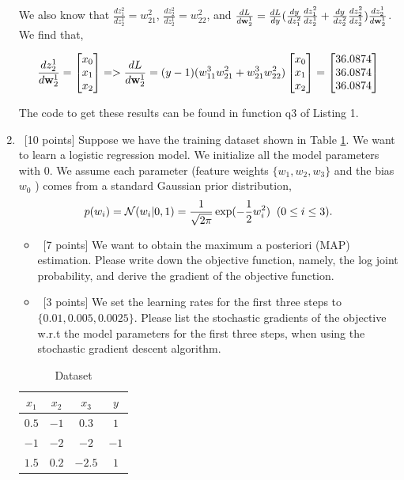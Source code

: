 \documentclass[12pt, fullpage,letterpaper]{article}
\begin{document}
\begin{enumerate}
	We also know that $\frac{dz^2_1}{dz^1_2} = w^2_{21}$, $\frac{dz^2_2}{dz^1_2} = w^2_{22}$, and $\frac{dL}{d{\bf w}^1_2} = \frac{dL}{dy} (\frac{dy}{dz^2_1} \frac{dz^2_1}{dz^1_2} + \frac{dy}{dz^2_2} \frac{dz^2_2}{dz^1_2}) \frac{dz^1_2} {d{\bf w}^1_2}$. We find that,
	
	\[
	    \frac{dz^1_2}{d{\bf w}^1_2} = \begin{bmatrix}
	        x_0 \\
	        x_1 \\
	        x_2
	    \end{bmatrix} => \frac{dL}{d{\bf w}^1_2} = (y - 1) (w^3_{11} w^2_{21} + w^3_{21} w^2_{22}) \begin{bmatrix}
	        x_0 \\
	        x_1 \\
	        x_2
	    \end{bmatrix} = \begin{bmatrix}
	        36.0874 \\
	        36.0874 \\
	        36.0874
	    \end{bmatrix}
	\]
	
	The code to get these results can be found in function q3 of Listing 1.
	
	\item~[10 points] Suppose we have the training dataset shown in Table \ref{tb:dt}. We want to learn a logistic regression model. We initialize all the model parameters with $0$.  We assume each parameter (\ie feature weights $\{w_1, w_2, w_3\}$ and the bias $w_0$ ) comes from a standard Gaussian prior distribution, 
	\[
	p(w_i) = \mathcal{N}(w_i|0,1) = \frac{1}{\sqrt{2\pi}}\exp(-\frac{1}{2}w_i^2)\;\;(0\le i\le 3).
	\]
	
	\begin{itemize}
		\item~[7 points] We want to obtain the  maximum a posteriori (MAP) estimation. Please write down the objective function, namely, the log joint probability, and derive the gradient of the objective function. 
		\item~[3 points] We set the learning rates for the first three steps to $\{0.01, 0.005, 0.0025\}$.  Please list the stochastic gradients of the objective w.r.t the model parameters for the first three steps, when using the stochastic gradient descent algorithm. 
	\end{itemize}
	\begin{table}[h]
		\centering
		\begin{tabular}{ccc|c}
			$x_1$ & $x_2$ & $x_3$ &  $y$\\ 
			\hline\hline
			$0.5$ & $-1$ & $0.3$ & $1$ \\ \hline
			$-1$ & $-2$ & $-2$ & $-1$\\ \hline
			$1.5$ & $0.2$ & $-2.5$ & $1$\\ \hline
		\end{tabular}
	\caption{Dataset} 
	\label{tb:dt}
	\end{table}

	
\end{enumerate}
\end{document}
